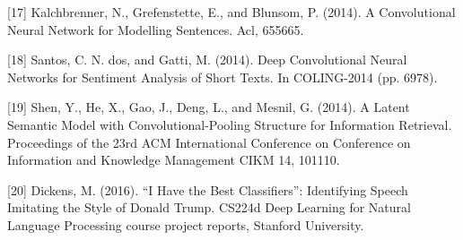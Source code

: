 \documentclass{article}
\begin{document}
[17] Kalchbrenner, N., Grefenstette, E., and Blunsom, P. (2014). A Convolutional Neural Network for Modelling Sentences. Acl, 655665.

[18] Santos, C. N. dos, and Gatti, M. (2014). Deep Convolutional Neural Networks for Sentiment Analysis of Short Texts. In COLING-2014 (pp. 6978).

[19] Shen, Y., He, X., Gao, J., Deng, L., and Mesnil, G. (2014). A Latent Semantic Model with Convolutional-Pooling Structure for Information Retrieval. Proceedings of the 23rd ACM International Conference on Conference on Information and Knowledge Management CIKM 14, 101110.

[20] Dickens, M. (2016). “I Have the Best Classifiers”: Identifying Speech Imitating the Style of Donald Trump. CS224d Deep Learning for Natural Language Processing course project reports, Stanford University.
\end{document}
